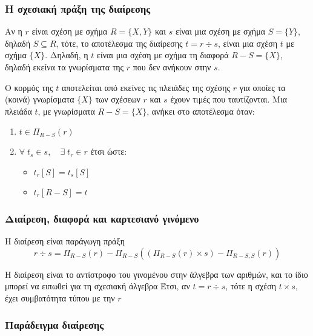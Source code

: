 \begin{frame}[shrink]




\begin{frame}[shrink]
\frametitle{Η σχεσιακή πράξη της διαίρεσης}

Αν η $r$ είναι σχέση με σχήμα $R=\{X,Y\}$ και $s$ είναι μια σχέση
με σχήμα $S=\{Y\}$, δηλαδή $S \subseteq R$, τότε,
το αποτέλεσμα της διαίρεσης $t = r \div s$, 
είναι μια  σχέση $t$ με σχήμα $\{X\}$. 
Δηλαδή, η $t$ είναι μια σχέση με σχήμα τη διαφορά
$R-S=\{X\}$, δηλαδή εκείνα τα γνωρίσματα της $r$ που δεν ανήκουν στην $s$.

Ο κορμός της $t$ αποτελείται από εκείνες τις πλειάδες
της σχέσης $r$ για οποίες τα (κοινά) γνωρίσματα $\{X\}$ των σχέσεων $r$ και $s$ 
έχουν τιμές που ταυτίζονται. 
Μια πλειάδα $t$, με γνωρίσματα $R-S=\{X\}$, ανήκει στο αποτέλεσμα όταν:

\begin{enumerate}
  \item $t \in \Pi_{R-S}(r)$ 
  \item  $ \forall \; t_s \in s, \quad   \exists \; t_r \in r$ έτσι ώστε:
  \begin{itemize}
    \item $t_r[S] = t_s[S]$
    \item $t_r[R-S] = t$ 	
  \end{itemize}
\end{enumerate}

\end{frame}



\begin{frame}[shrink]
\frametitle{Διαίρεση, διαφορά και καρτεσιανό γινόμενο}
\begin{block}{Η διαίρεση είναι παράγωγη πράξη}
\[
 r \div s = \Pi_{R-S}(r) - \Pi_{R-S}\left( (\Pi_{R-S}(r) \times s  ) - \Pi_{R-S,S}(r) \right)
\]
\end{block}

\begin{block}{Η διαίρεση είναι το αντίστροφο του γινομένου στην άλγεβρα των αριθμών, και το ίδιο μπορεί
να ειπωθεί για τη σχεσιακή άλγεβρα}
Έτσι, αν $t = r \div s$, τότε η σχέση $t \times s$, έχει
συμβατότητα τύπου με την $r$
\end{block}

\end{frame}



\begin{frame}[shrink]
\frametitle{Παράδειγμα διαίρεσης}


\end{frame}
\end{frame}
